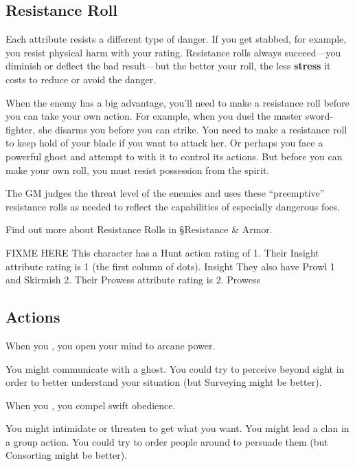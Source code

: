 \subsection{Resistance Roll}

Each attribute resists a different type of danger. If you get stabbed, for example, you resist physical harm with your  rating. Resistance rolls always succeed—you diminish or deflect the bad result—but the better your roll, the less \textbf{stress} it costs to reduce or avoid the danger.

When the enemy has a big advantage, you’ll need to make a resistance roll before you can take your own action. For example, when you duel the master sword-fighter, she disarms you before you can strike. You need to make a resistance roll to keep hold of your blade if you want to attack her. Or perhaps you face a powerful ghost and attempt to  with it to control its actions. But before you can make your own roll, you must resist possession from the spirit.

The GM judges the threat level of the enemies and uses these ``preemptive'' resistance rolls as needed to reflect the capabilities of especially dangerous foes.

Find out more about Resistance Rolls in  \S Resistance \& Armor.

FIXME HERE
This character has a Hunt action rating of 1.
Their Insight attribute rating is 1 (the first column of dots). Insight
They also have Prowl 1 and Skirmish 2.
Their Prowess attribute rating is 2. Prowess

\subsection{Actions}

When you , you open your mind to arcane power.

\begin{qb}You might communicate with a ghost. You could try to perceive beyond sight in order to better understand your situation (but Surveying might be better).\end{qb}

When you , you compel swift obedience.

\begin{qb}You might intimidate or threaten to get what you want. You might lead a clan in a group action. You could try to order people around to persuade them (but Consorting might be better).\end{qb}

